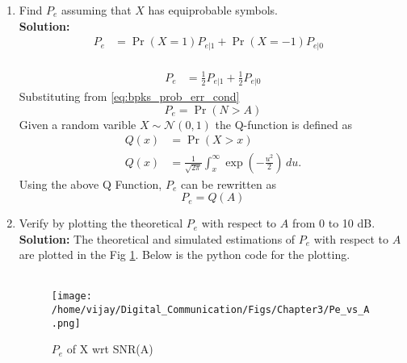 \documentclass[journal,10pt,twocolumn]{IEEEtran}
\newcounter{Chapcounter}
\numberwithin{equation}{subsection}
\numberwithin{figure}{subsection}
\renewcommand\thesection{\theChapcounter.\arabic{section}}
\providecommand{\pr}[1]{\ensuremath{\Pr\left(#1\right)}}
\newcommand{\solution}{\noindent \textbf{Solution: }}
\providecommand{\gauss}[2]{\mathcal{N}\ensuremath{\left(#1,#2\right)}}
\renewcommand\thesection{\arabic{section}}
\renewcommand\thesubsection{\thesection.\arabic{subsection}}
\begin{document}
\begin{enumerate}[label=\thesubsection.\arabic*,ref=\thesubsection.\arabic{figure}]
 \item Find $P_e$ assuming that $X$ has equiprobable symbols.\\
 \solution \begin{align}
	P_e &= \pr{X=1}P_{e|1} + \pr{X=-1}P_{e|0}& \label{eq:Pe_of_X}
	\end{align}
	\\
	\begin{align}
	P_e &= \frac{1}{2}P_{e|1} + \frac{1}{2}P_{e|0}
\end{align}
Substituting from \eqref{eq:bpks_prob_err_cond}
\begin{equation}
	P_e = \pr{N > A}
\end{equation}
Given a random varible $X \sim \gauss{0}{1}$ the Q-function is defined as
\begin{align}
	Q(x) &= \pr{X > x}\\
	\label{eq:q_func_integral}
	Q(x) &= \frac{1}{\sqrt{2\pi}} \int_x^\infty \exp\left(-\frac{u^2}{2}\right) \, du.
\end{align}
Using the above Q Function, $P_e$ can be rewritten as
\begin{equation}
	P_e = Q(A)
\end{equation} 
\item
Verify by plotting  the theoretical $P_e$ with respect to $A$ from 0 to 10 dB.\\
\solution 
The theoretical and simulated estimations of $P_e$ with respect to $A$ are plotted in the Fig \ref{fig:bpsk1}. Below is the python code for the plotting. \\

\\	
	
\begin{figure}[!ht]
\centering
\texttt{[image: /home/vijay/Digital\_Communication/Figs/Chapter3/Pe\_vs\_A.png]}   
\caption{$P_e$ of X wrt SNR(A)}
\label{fig:bpsk1}
\end{figure}


\end{enumerate}
\end{document}

